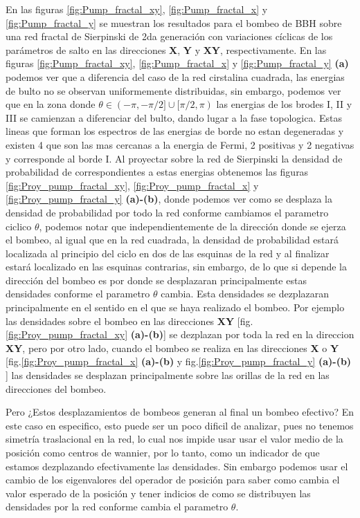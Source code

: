 En las figuras \ref{fig:Pump_fractal_xy}, \ref{fig:Pump_fractal_x} y \ref{fig:Pump_fractal_y} se muestran los resultados para el bombeo  de BBH sobre una red fractal de Sierpinski de 2da generación con variaciones cíclicas de los parámetros de salto en las direcciones \textbf{X}, \textbf{Y} y \textbf{XY}, respectivamente. En las figuras \ref{fig:Pump_fractal_xy}, \ref{fig:Pump_fractal_x} y \ref{fig:Pump_fractal_y} \textbf{(a)} podemos ver que a diferencia del caso de la red cirstalina cuadrada, las energias de bulto no se observan uniformemente distribuidas, sin embargo, podemos ver que en la zona donde $\theta \in (-\pi,-\pi/2] \cup [\pi/2,\pi)$ las energias de los brodes I, II y III se camienzan a diferenciar del bulto, dando lugar a la fase topologica. Estas lineas que forman los espectros de las energias de borde no estan degeneradas y existen 4 que son las mas cercanas a la energia de Fermi, 2 positivas y 2 negativas y corresponde al borde I. Al proyectar sobre la red de Sierpinski la densidad de probabilidad de correspondientes a estas energias obtenemos las figuras \ref{fig:Proy_pump_fractal_xy}, \ref{fig:Proy_pump_fractal_x} y  \ref{fig:Proy_pump_fractal_y} \textbf{(a)-(b)}, donde podemos ver como se desplaza la densidad de probabilidad por todo la red conforme cambiamos el parametro ciclico $\theta$, podemos notar que independientemente de la dirección donde se ejerza el bombeo, al igual que en la red cuadrada, la densidad de probabilidad estará localizada al principio del ciclo en dos de las esquinas de la red y al finalizar estará localizado en las esquinas contrarias, sin embargo, de lo que si depende la dirección del bombeo es por donde se desplazaran principalmente estas densidades conforme el parametro $\theta$ cambia. Esta densidades se dezplazaran principalmente en el sentido en el que se haya realizado el bombeo. Por ejemplo las densidades sobre el bombeo en las direcciones \textbf{XY} [fig.\ref{fig:Proy_pump_fractal_xy}  \textbf{(a)-(b)}] se dezplazan por toda la red en la direccion \textbf{XY}, pero por otro lado, cuando el bombeo se realiza en las direcciones \textbf{X} o \textbf{Y} [fig.\ref{fig:Proy_pump_fractal_x}  \textbf{(a)-(b)} y fig.\ref{fig:Proy_pump_fractal_y}  \textbf{(a)-(b)} ] las densidades se desplazan principalmente sobre las orillas de la red en las direcciones del bombeo. 

Pero ¿Estos desplazamientos de bombeos generan al final un bombeo efectivo? En este caso en especifico, esto puede ser un poco dificil de analizar, pues no tenemos simetría traslacional en la red, lo cual nos impide usar usar el valor medio de la posición como centros de wannier, por lo tanto, como un indicador de que estamos dezplazando efectivamente las densidades. Sin embargo podemos usar el cambio de los eigenvalores del operador de posición para saber como cambia el valor esperado de la posición y tener indicios de como se distribuyen las densidades por la red conforme cambia el parametro $\theta$.


